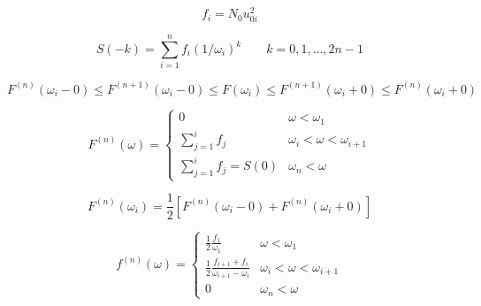 \begin{equation}
  f_i = N_0 u_{0i}^2
\end{equation}

\begin{equation}
  S(-k) = \sum\limits_{i=1}^n f_i (1/\omega_i)^k \quad\quad k=0,1,\dots,2n-1
\end{equation}


\begin{equation}
  F^{(n)}(\omega_i - 0) \le F^{(n+1)}(\omega_i - 0) \le F(\omega_i)
  \le F^{(n+1)}(\omega_i + 0) \le F^{(n)}(\omega_i + 0)
\end{equation}


\begin{figure}[h]
  \centering
  
  \caption{}
  \label{}
\end{figure}



\begin{equation}
  F^{(n)} (\omega) =
  \begin{cases}
    0                                & \omega < \omega_1\\
    \sum\limits_{j=1}^{i} f_j        & \omega_i < \omega < \omega_{i+1}\\
    \sum\limits_{j=1}^{i} f_j = S(0) & \omega_n < \omega
  \end{cases}
\end{equation}

\begin{equation}
  F^{(n)} (\omega_i) = \frac 12 \left[ F^{(n)} (\omega_i - 0)
                       + F^{(n)} (\omega_i+0) \right]
\end{equation}

\begin{equation}
  f^{(n)} (\omega) =
  \begin{cases}
    \frac 12 \frac{f_1}{\omega_1}    & \omega < \omega_1\\
    \frac 12 \frac{f_{i+1} + f_i}{\omega_{i+1} - \omega_i}
                                     & \omega_i < \omega < \omega_{i+1}\\
    0                                & \omega_n < \omega
  \end{cases}
\end{equation}

